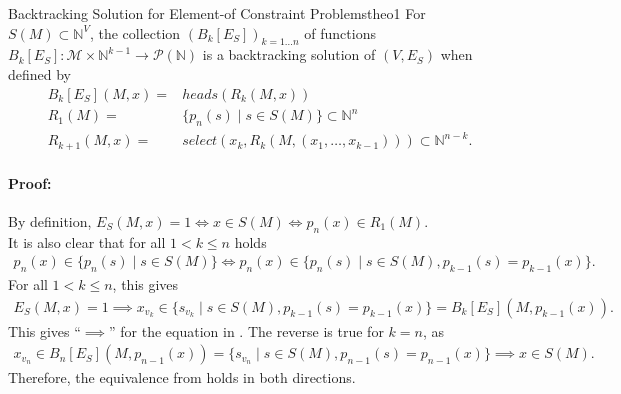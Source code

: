 \begin{theorem}{Backtracking Solution for Element-of Constraint Problems}{theo1}
    For $S(M)\subset\mathbb N^V$, the collection $(B_k[E_S])_{k=1\dots n}$ of
    functions
    $B_k[E_S]\colon\mathcal M\times\mathbb N^{k-1}\rightarrow\mathcal P(\mathbb N)$
    is a backtracking solution of $(V,E_S)$ when defined by
    \begin{align*}
        B_k[E_S](M,x)={}&heads(R_k(M,x))\\
        R_1(M)={}&\{p_n(s)\mid s\in S(M)\}\subset\mathbb N^{n}\\
        R_{k+1}(M,x)={}&select(x_k,R_k(M,(x_1,\dots,x_{k-1})))\subset\mathbb N^{n-k}.
    \end{align*}
    \tcblower
    \paragraph*{Proof:} By definition,
    $E_S(M,x)=1\iff x\in S(M)\iff p_n(x)\in R_1(M)$.\\
    It is also clear that for all $1<k\leq n$ holds
    \begin{align*}
        p_n(x)\in\{p_n(s)\mid s\in S(M)\}\iff p_n(x)\in\{p_n(s)\mid s\in S(M),p_{k-1}(s)=p_{k-1}(x)\}.
    \end{align*}
    For all $1<k\leq n$, this gives
    \begin{align*}
        E_S(M,x)=1\implies x_{v_k}\in\{s_{v_k}\mid s\in S(M),p_{k-1}(s)=p_{k-1}(x)\}=B_k[E_S](M,p_{k-1}(x)).
    \end{align*}
    This gives ``$\implies$'' for the equation in .
    The reverse is true for $k=n$, as
    \begin{align*}
        x_{v_n}\in B_n[E_S](M,p_{n-1}(x))=\{s_{v_n}\mid s\in S(M),p_{n-1}(s)=p_{n-1}(x)\}\implies x\in S(M).
    \end{align*}
    Therefore, the equivalence from  holds in both directions.
\end{theorem}
